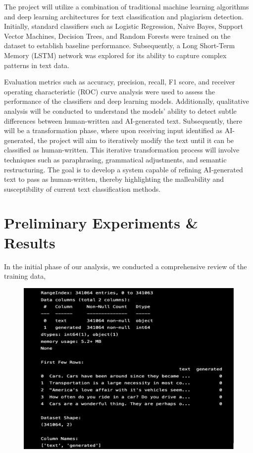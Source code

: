\documentclass[11pt,a4paper]{article}
\begin{document}
The project will utilize a combination of traditional machine learning algorithms and deep learning architectures for text classification and plagiarism detection. Initially, standard classifiers such as Logistic Regression, Naive Bayes, Support Vector Machines, Decision Trees, and Random Forests were trained on the dataset to establish baseline performance. Subsequently, a Long Short-Term Memory (LSTM) network was explored for its ability to capture complex patterns in text data. 

Evaluation metrics such as accuracy, precision, recall, F1 score, and receiver operating characteristic (ROC) curve analysis were used to assess the performance of the classifiers and deep learning models. Additionally, qualitative analysis will be conducted to understand the models' ability to detect subtle differences between human-written and AI-generated text. Subsequently, there will be a transformation phase, where upon receiving input identified as AI-generated, the project will aim to iteratively modify the text until it can be classified as human-written. This iterative transformation process will involve techniques such as paraphrasing, grammatical adjustments, and semantic restructuring. The goal is to develop a system capable of refining AI-generated text to pass as human-written, thereby highlighting the malleability and susceptibility of current text classification methods. 


\section{Preliminary Experiments \& Results}

In the initial phase of our analysis, we conducted a comprehensive review of the training data,  

\begin{figure}[htbp]
  \centering
  \includegraphics[width=0.8\linewidth]{Fig1.png}
\end{figure}
\end{document}
